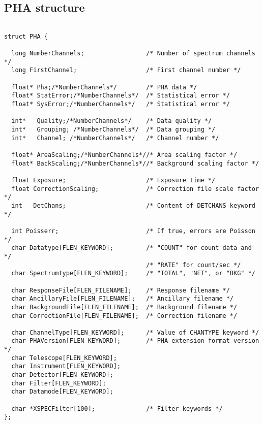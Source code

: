 \documentclass[11pt]{book}
\begin{document}
\subsection{PHA structure}

\begin{verbatim}

struct PHA {

  long NumberChannels;                 /* Number of spectrum channels */
  long FirstChannel;                   /* First channel number */

  float* Pha;/*NumberChannels*/        /* PHA data */
  float* StatError;/*NumberChannels*/  /* Statistical error */
  float* SysError;/*NumberChannels*/   /* Statistical error */

  int*   Quality;/*NumberChannels*/    /* Data quality */
  int*   Grouping; /*NumberChannels*/  /* Data grouping */
  int*   Channel; /*NumberChannels*/   /* Channel number */

  float* AreaScaling;/*NumberChannels*//* Area scaling factor */
  float* BackScaling;/*NumberChannels*//* Background scaling factor */

  float Exposure;                      /* Exposure time */
  float CorrectionScaling;             /* Correction file scale factor */
  int   DetChans;                      /* Content of DETCHANS keyword */

  int Poisserr;                        /* If true, errors are Poisson */
  char Datatype[FLEN_KEYWORD];         /* "COUNT" for count data and */
                                       /* "RATE" for count/sec */
  char Spectrumtype[FLEN_KEYWORD];     /* "TOTAL", "NET", or "BKG" */

  char ResponseFile[FLEN_FILENAME];    /* Response filename */
  char AncillaryFile[FLEN_FILENAME];   /* Ancillary filename */
  char BackgroundFile[FLEN_FILENAME];  /* Background filename */
  char CorrectionFile[FLEN_FILENAME];  /* Correction filename */

  char ChannelType[FLEN_KEYWORD];      /* Value of CHANTYPE keyword */
  char PHAVersion[FLEN_KEYWORD];       /* PHA extension format version */
  char Telescope[FLEN_KEYWORD];                             
  char Instrument[FLEN_KEYWORD];
  char Detector[FLEN_KEYWORD];
  char Filter[FLEN_KEYWORD];
  char Datamode[FLEN_KEYWORD];

  char *XSPECFilter[100];              /* Filter keywords */
};

\end{verbatim}
\end{document}
